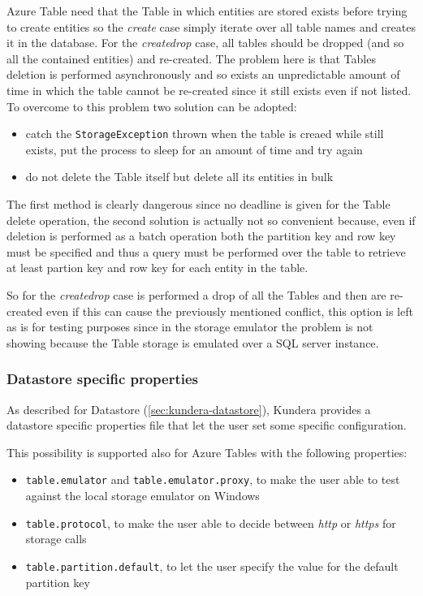 \newparagraph Azure Table need that the Table in which entities are stored exists before trying to create entities so the \textit{create} case simply iterate over all table names and creates it in the database. 
For the \textit{create\textunderscore drop} case, all tables should be dropped (and so all the contained entities) and re-created. The problem here is that Tables deletion is performed asynchronously and so exists an unpredictable amount of time in which the table cannot be re-created since it still exists even if not listed.
\noindent To overcome to this problem two solution can be adopted:
\begin{itemize}
\item catch the \texttt{StorageException} thrown when the table is creaed while still exists, put the process to sleep for an amount of time and try again
\item do not delete the Table itself but delete all its entities in bulk
\end{itemize}

\noindent The first method is clearly dangerous since no deadline is given for the Table delete operation, the second solution is actually not so convenient because, even if deletion is performed as a batch operation both the partition key and row key must be specified and thus a query must be performed over the table to retrieve at least partion key and row key for each entity in the table.  

\noindent So for the \textit{create\textunderscore drop} case is performed a drop of all the Tables and then are re-created even if this can cause the previously mentioned conflict, this option is left as is for testing purposes since in the storage emulator the problem is not showing because the Table storage is emulated over a SQL server instance.

\subsubsection{Datastore specific properties}
As described for Datastore (\ref{sec:kundera-datastore}), Kundera provides a datastore specific properties file that let the user set some specific configuration.

\noindent This possibility is supported also for Azure Tables with the following properties:
\begin{itemize}
\item \texttt{table.emulator} and \texttt{table.emulator.proxy}, to make the user able to test against the local storage emulator on Windows
\item \texttt{table.protocol}, to make the user able to decide between \textit{http} or \textit{https} for storage calls
\item \texttt{table.partition.default}, to let the user specify the value for the default partition key 
\end{itemize} 

